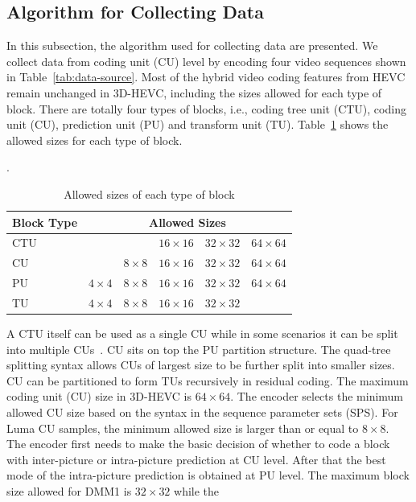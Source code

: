 \subsection{Algorithm for Collecting Data}\label{subsec:collecting-method}
In this subsection, the algorithm used for collecting data are presented.
We collect data from coding unit (CU) level 
by encoding four video sequences shown in
Table~\ref{tab:data-source}.
Most of the hybrid video coding features from HEVC remain unchanged
in 3D-HEVC, including the sizes allowed for each type of block.
There are totally four types of blocks, i.e., coding tree unit (CTU),
coding unit (CU), prediction unit (PU) and transform unit (TU).
Table~\ref{tab:allowed-sizes-of-each-type-of-block} shows the allowed sizes
for each type of block.
\begin{table}[!htbp]
    \caption{Allowed sizes of 
    each type of block}\label{tab:allowed-sizes-of-each-type-of-block}.
    \bigskip
    \centering
    \begin{tabular}{l c c c c c}
        \toprule
        Block Type & \multicolumn{5}{c}{Allowed Sizes}\\
        \midrule
        CTU & & & $16\times16$ & $32\times32$ & $64\times64$\\
        CU  & & $8\times8$ & $16\times16$ & $32\times32$ & $64\times64$\\
        PU  & $4\times4$ & $8\times8$ & $16\times16$ & $32\times32$ & $64\times64$\\
        TU  & $4\times4$ & $8\times8$ & $16\times16$ & $32\times32$ & \\
        \bottomrule
    \end{tabular}
\end{table}
A CTU itself can be used as a single CU while in some scenarios it can
be split into multiple CUs~\parencite{RN46}.
CU sits on top the PU partition structure.
The quad-tree splitting syntax allows CUs of largest size to be further
split into smaller sizes.
CU can be partitioned to form TUs recursively in residual coding.
The maximum coding unit (CU) size in 3D-HEVC is \(64\times64\).
The encoder selects the minimum allowed CU size based on the syntax in
the sequence parameter sets (SPS).
For Luma CU samples, the minimum allowed size is larger than or equal to
\(8\times8\).
The encoder first needs to make the basic decision of whether to code a
block with inter-picture or intra-picture prediction at CU level.
After that the best mode of the intra-picture prediction is
obtained at PU level.
The maximum block size allowed for DMM1 is \(32\times32\) while the
